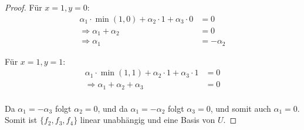 \documentclass{../problemset}
\begin{document}
\begin{problem}
\begin{proof}
	Für $x = 1, y = 0$:
	\begin{align*}
		\alpha_1 \cdot \min(1, 0) + \alpha_2 \cdot 1 + \alpha_3 \cdot 0 & = 0         \\
		\Rightarrow \alpha_1 + \alpha_2                                 & = 0         \\
		\Rightarrow \alpha_1                                            & = -\alpha_2
	\end{align*}

	Für $x = 1, y = 1$:
	\begin{align*}
		\alpha_1 \cdot \min(1, 1) + \alpha_2 \cdot 1 + \alpha_3 \cdot 1 & = 0 \\
		\Rightarrow \alpha_1 + \alpha_2 + \alpha_3                      & = 0 \\
	\end{align*}

	Da $\alpha_1 = - \alpha_3$ folgt $\alpha_2 = 0$, und da $\alpha_1 = - \alpha_2$ folgt $\alpha_3 = 0$, und somit auch $\alpha_1 = 0$.
	Somit ist $\{f_2, f_3, f_4\}$ linear unabhängig und eine Basis von $U$.
\end{proof}
\end{problem}

\pagebreak
\end{document}
